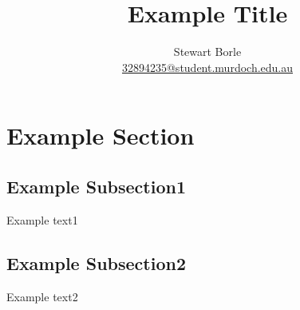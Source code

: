 \documentclass{article}
\author{Stewart Borle \\ \href{mailto:32894235@student.murdoch.edu.au}{32894235@student.murdoch.edu.au}}
\begin{document}
\pagecolor{gray!178}
\color{white}

\title{Example Title}
\maketitle

\tableofcontents

\section{Example Section}

\subsection{Example Subsection1}
Example text1

\subsection{Example Subsection2}
Example text2
\end{document}

